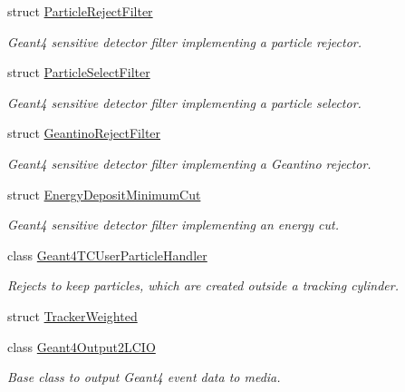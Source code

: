 \begin{DoxyCompactItemize}
struct \hyperlink{struct_d_d4hep_1_1_simulation_1_1_particle_reject_filter}{ParticleRejectFilter}
\begin{DoxyCompactList}\small\item\em Geant4 sensitive detector filter implementing a particle rejector. \item\end{DoxyCompactList}\item 
struct \hyperlink{struct_d_d4hep_1_1_simulation_1_1_particle_select_filter}{ParticleSelectFilter}
\begin{DoxyCompactList}\small\item\em Geant4 sensitive detector filter implementing a particle selector. \item\end{DoxyCompactList}\item 
struct \hyperlink{struct_d_d4hep_1_1_simulation_1_1_geantino_reject_filter}{GeantinoRejectFilter}
\begin{DoxyCompactList}\small\item\em Geant4 sensitive detector filter implementing a Geantino rejector. \item\end{DoxyCompactList}\item 
struct \hyperlink{struct_d_d4hep_1_1_simulation_1_1_energy_deposit_minimum_cut}{EnergyDepositMinimumCut}
\begin{DoxyCompactList}\small\item\em Geant4 sensitive detector filter implementing an energy cut. \item\end{DoxyCompactList}\item 
class \hyperlink{class_d_d4hep_1_1_simulation_1_1_geant4_t_c_user_particle_handler}{Geant4TCUserParticleHandler}
\begin{DoxyCompactList}\small\item\em Rejects to keep particles, which are created outside a tracking cylinder. \item\end{DoxyCompactList}\item 
struct \hyperlink{struct_d_d4hep_1_1_simulation_1_1_tracker_weighted}{TrackerWeighted}
\item 
class \hyperlink{class_d_d4hep_1_1_simulation_1_1_geant4_output2_l_c_i_o}{Geant4Output2LCIO}
\begin{DoxyCompactList}\small\item\em Base class to output Geant4 event data to media. \item\end{DoxyCompactList}\item 

\end{DoxyCompactItemize}
